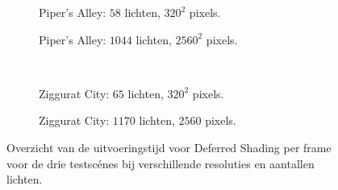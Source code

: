 \begin{figure}[t]
\begin{adjustbox}{minipage=\textwidth, scale=0.55}
\begin{subfigure}[b]{0.8\textwidth}
      \caption{Piper's Alley: $58$ lichten, $320^2$ pixels.}
      \label{fig:ts-frames-deferred:alley-low}
    \end{subfigure}
  \end{adjustbox}\hspace{-0.075\textwidth}  %
  \begin{adjustbox}{minipage=\textwidth, scale=0.55}
    \begin{subfigure}[b]{0.8\textwidth}
      \centering
      \def\svgwidth{\textwidth}
      
      \caption{Piper's Alley: $1044$ lichten, $2560^2$ pixels.}
      \label{fig:ts-frames-deferred:alley-high}
    \end{subfigure}
  \end{adjustbox} \\
  \begin{adjustbox}{minipage=\textwidth, scale=0.55}
    \begin{subfigure}[b]{0.8\textwidth}
      \centering
      \def\svgwidth{\textwidth}
      
      \caption{Ziggurat City: $65$ lichten, $320^2$ pixels.}
      \label{fig:ts-frames-deferred:city-low}
    \end{subfigure}
  \end{adjustbox}\hspace{-0.075\textwidth}  %
  \begin{adjustbox}{minipage=\textwidth, scale=0.55}
    \begin{subfigure}[b]{0.8\textwidth}
      \centering
      \def\svgwidth{\textwidth}
      
      \caption{Ziggurat City: $1170$ lichten, $2560$ pixels.}
      \label{fig:ts-frames-deferred:city-high}
    \end{subfigure}
  \end{adjustbox}
  \caption{Overzicht van de uitvoeringstijd voor Deferred Shading per frame voor de
           drie testsc\'enes bij verschillende resoluties en aantallen
           lichten.}
  \label{fig:ts-frames-deferred}
\end{figure}

